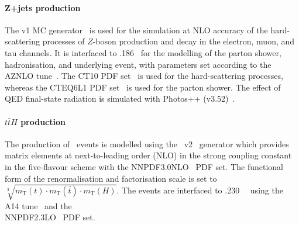 \paragraph{Z+jets production}     
The \powhegbox v1 MC generator~\cite{Nason:2004rx,Frixione:2007vw,Alioli:2010xd,Alioli:2008gx}
is used for the simulation at NLO accuracy of the hard-scattering processes of 
$Z$-boson production and decay in the electron, muon, and tau
channels. It is interfaced to \pythia{}.186~\cite{Sjostrand:2007gs}
for the modelling of the parton shower, hadronisation, and underlying
event, with parameters set according to the AZNLO
tune~\cite{STDM-2012-23}. The CT10 PDF set~\cite{Lai:2010vv} is used
for the hard-scattering processes, whereas the CTEQ6L1 PDF
set~\cite{Pumplin:2002vw} is used for the parton shower. The effect of
QED final-state radiation is simulated with Photos++
(v3.52)~\cite{Golonka:2005pn,Davidson:2010ew}.

\paragraph{$t\bar{t}H$ production}
The production of \ttH\ events is modelled using the
\powhegbox~v2~\cite{Frixione:2007nw,Nason:2004rx,Frixione:2007vw,Alioli:2010xd,Hartanto:2015uka}
generator which provides matrix elements at next-to-leading order (NLO) in the strong coupling 
constant \alphas in the five-flavour scheme with the \textsc{NNPDF3.0NLO}~\cite{Ball:2014uwa} PDF set.
The functional form of the renormalisation and factorisation scale is 
set to $\sqrt[3]{m_\text{T}(t)\cdot m_\text{T}(\bar{t}) \cdot m_\text{T}(H)}$.
The events are interfaced to \pythia.230~\cite{Sjostrand:2014zea}~
using the A14 tune~\cite{ATL-PHYS-PUB-2014-021} and the
\\ \textsc{NNPDF2.3LO}~\cite{Ball:2014uwa} PDF set. 

